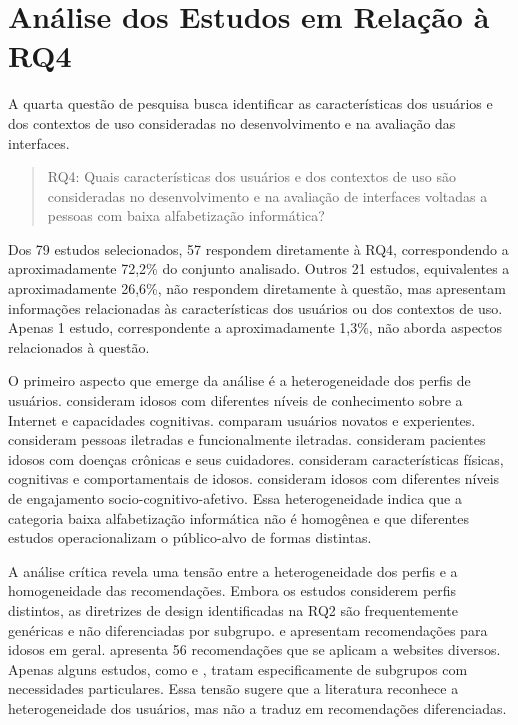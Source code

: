 \section{Análise dos Estudos em Relação à RQ4}

A quarta questão de pesquisa busca identificar as características dos usuários e dos contextos de uso consideradas no desenvolvimento e na avaliação das interfaces.

\begin{quote}

RQ4: Quais características dos usuários e dos contextos de uso são consideradas no desenvolvimento e na avaliação de interfaces voltadas a pessoas com baixa alfabetização informática?

\end{quote}

Dos 79 estudos selecionados, 57 respondem diretamente à RQ4, correspondendo a aproximadamente 72,2\% do conjunto analisado. Outros 21 estudos, equivalentes a aproximadamente 26,6\%, não respondem diretamente à questão, mas apresentam informações relacionadas às características dos usuários ou dos contextos de uso. Apenas 1 estudo, correspondente a aproximadamente 1,3\%, não aborda aspectos relacionados à questão.

O primeiro aspecto que emerge da análise é a heterogeneidade dos perfis de usuários. \cite{sharit2008information} consideram idosos com diferentes níveis de conhecimento sobre a Internet e capacidades cognitivas. \cite{nosseir2011novice} comparam usuários novatos e experientes. \cite{filgueiras2009recoverability} consideram pessoas iletradas e funcionalmente iletradas. \cite{barron2013feasibility} consideram pacientes idosos com doenças crônicas e seus cuidadores. \cite{ahmad2013teaching} consideram características físicas, cognitivas e comportamentais de idosos. \cite{lee2021factors} consideram idosos com diferentes níveis de engajamento socio-cognitivo-afetivo. Essa heterogeneidade indica que a categoria baixa alfabetização informática não é homogênea e que diferentes estudos operacionalizam o público-alvo de formas distintas.

A análise crítica revela uma tensão entre a heterogeneidade dos perfis e a homogeneidade das recomendações. Embora os estudos considerem perfis distintos, as diretrizes de design identificadas na RQ2 são frequentemente genéricas e não diferenciadas por subgrupo. \cite{kurniawan2005research} e \cite{sun2010preliminary} apresentam recomendações para idosos em geral. \cite{dombrovskaia2021guideline} apresenta 56 recomendações que se aplicam a websites diversos. Apenas alguns estudos, como \cite{filgueiras2009recoverability} e \cite{gonzalez2025augmenting}, tratam especificamente de subgrupos com necessidades particulares. Essa tensão sugere que a literatura reconhece a heterogeneidade dos usuários, mas não a traduz em recomendações diferenciadas.

